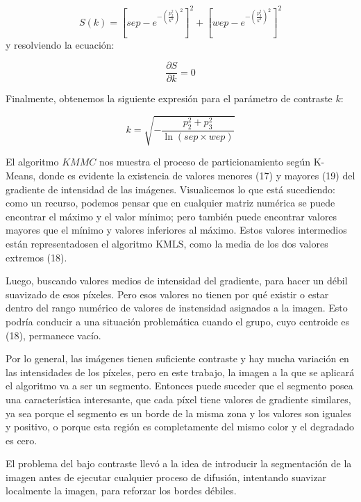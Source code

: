 \documentclass[a4paper,10pt,twocolumn]{article}
\begin{document}
\begin{equation}
	S(k) = \left [sep - e^{-(\frac{p_2^2}{k^2})^2} \right ]^2 + \left [wep - e^{-(\frac{p_3^2}{k^2})^2} \right ]^2
\end{equation}
y resolviendo la ecuaci\'on:

\begin{equation}
	\frac{\partial S}{\partial k} = 0
\end{equation}

Finalmente, obtenemos la siguiente expresi\'on para el par\'ametro de contraste $k$:

\begin{equation}
	k = \sqrt{- \frac{p_2^2 + p_3^2}{\ln{(sep \times wep)} }}
\end{equation}

El algoritmo $KMMC$ nos muestra el proceso de particionamiento seg\'un K- Means, donde es evidente la existencia de valores menores (17) y mayores (19) del gradiente de intensidad de las im\'agenes. Visualicemos lo que est\'a sucediendo: como un recurso, podemos pensar que en cualquier matriz num\'erica se puede encontrar el m\'aximo y el valor m\'inimo; pero tambi\'en puede encontrar valores mayores que el m\'inimo y valores inferiores al m\'aximo. Estos valores intermedios est\'an representadosen el algoritmo KMLS, como la media de los dos valores extremos (18).

Luego, buscando valores medios de intensidad del gradiente, para hacer un d\'ebil suavizado de esos p\'ixeles. Pero esos valores no tienen por qu\'e existir o estar dentro del rango num\'erico de valores de instensidad asignados a la imagen. Esto podr\'ia conducir a una situaci\'on problem\'atica cuando el grupo, cuyo centroide es (18), permanece vac\'io.

Por lo general, las im\'agenes tienen suficiente contraste y hay mucha variaci\'on en las intensidades de los p\'ixeles, pero en este trabajo, la imagen a la que se aplicar\'a el algoritmo va a ser un segmento. Entonces puede suceder que el segmento posea una caracter\'istica interesante, que cada p\'ixel tiene valores de gradiente similares, ya sea porque el segmento es un borde de la misma zona y los valores son iguales y positivo, o porque esta regi\'on es completamente del mismo color y el degradado es cero.

El problema del bajo contraste llev\'o a la idea de introducir la segmentaci\'on de la imagen antes de ejecutar cualquier proceso de difusi\'on, intentando suavizar localmente la imagen, para reforzar los bordes d\'ebiles.
\end{document}
